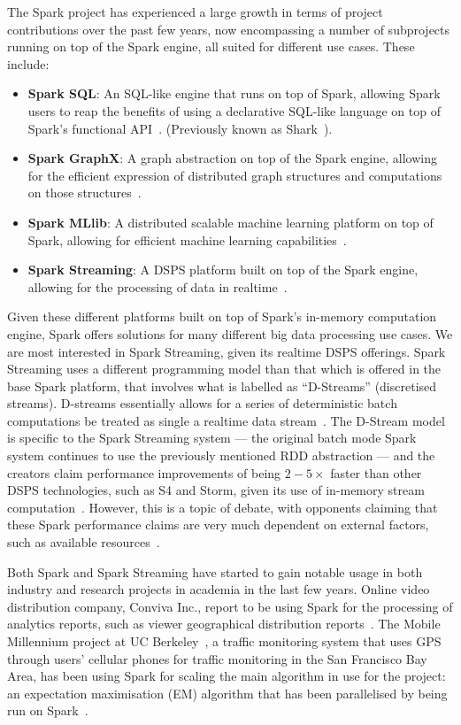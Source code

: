 The Spark project has experienced a large growth in terms of project contributions over the past few years, now
encompassing a number of subprojects running on top of the Spark engine, all suited for different use cases. These
include:

\begin{itemize}
  \item \textbf{Spark SQL}: An SQL-like engine that runs on top of Spark,
  allowing Spark users to reap the benefits of using a declarative SQL-like language on top of Spark's functional
  API~\cite{armbrustspark}. (Previously known as Shark~\cite{xin2013shark}).
  \item \textbf{Spark GraphX}: A graph abstraction on top of the Spark engine, allowing for the efficient expression of
  distributed graph structures and computations on those structures~\cite{xin2013graphx}.
  \item \textbf{Spark MLlib}: A distributed scalable machine learning platform on top of Spark, allowing for efficient
  machine learning capabilities~\cite{sparks2013mli}.
  \item \textbf{Spark Streaming}: A DSPS platform built on top of the Spark engine, allowing for the processing of data
  in realtime~\cite{zaharia2012discretized}.
\end{itemize}

Given these different platforms built on top of Spark's in-memory computation engine, Spark offers solutions for many
different big data processing use cases. We are most interested in Spark Streaming, given its realtime DSPS offerings.
Spark Streaming uses a different programming model than that which is offered in the base Spark platform, that involves what
is labelled as ``D-Streams'' (discretised streams). D-streams essentially allows for a series of deterministic batch computations
be treated as single a realtime data stream~\cite{zaharia2012discretized}. The D-Stream model is specific to the Spark Streaming
system --- the original batch mode Spark system continues to use the previously mentioned RDD abstraction --- and the
creators claim performance improvements of being $2-5\times$ faster than other DSPS technologies, such as S4
and Storm, given its use of in-memory stream computation~\cite{zaharia2013discretized}. However, this is a topic of debate,
with opponents claiming that these Spark performance claims are very much dependent on external factors, such as
available resources~\cite{web_slideshare_b}.

Both Spark and Spark Streaming have started to gain notable usage in both industry and research projects in academia in
the last few years. Online video distribution company, Conviva Inc., report to be using Spark for the processing of
analytics reports, such as viewer geographical distribution reports~\cite{web_spark_conviva,zaharia2012fast}. The Mobile
Millennium project at UC Berkeley~\cite{web_spark_mmp}, a traffic monitoring system that uses GPS through users'
cellular phones for traffic monitoring in the San Francisco Bay Area, has been using Spark for scaling the main
algorithm in use for the project: an expectation maximisation (EM) algorithm that has been parallelised by being run on
Spark~\cite{hunter2011scaling}.

